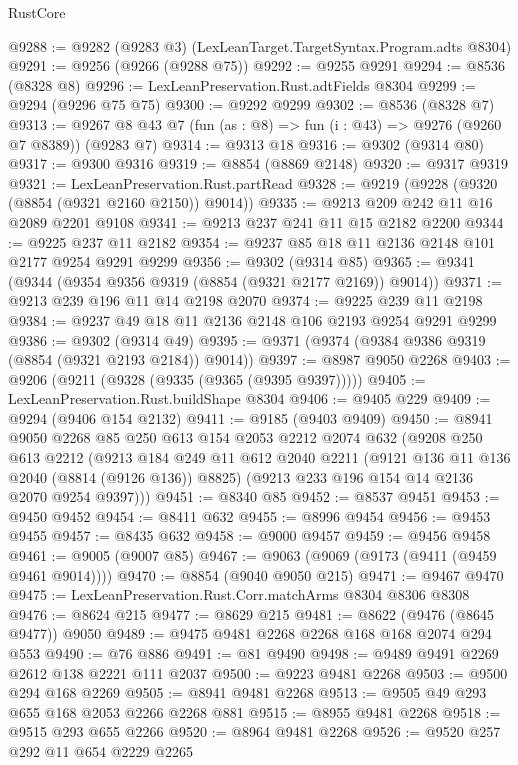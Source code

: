 \begin{lexlean}{RustCore}
\begin{coremodule}
@9288 := @9282 (@9283 @3) (LexLeanTarget.TargetSyntax.Program.adts @8304)
@9291 := @9256 (@9266 (@9288 @75))
@9292 := @9255 @9291
@9294 := @8536 (@8328 @8)
@9296 := LexLeanPreservation.Rust.adtFields @8304
@9299 := @9294 (@9296 @75 @75)
@9300 := @9292 @9299
@9302 := @8536 (@8328 @7)
@9313 := @9267 @8 @43 @7 (fun (as : @8) => fun (i : @43) => @9276 (@9260 @7 @8389)) (@9283 @7)
@9314 := @9313 @18
@9316 := @9302 (@9314 @80)
@9317 := @9300 @9316
@9319 := @8854 (@8869 @2148)
@9320 := @9317 @9319
@9321 := LexLeanPreservation.Rust.partRead
@9328 := @9219 (@9228 (@9320 (@8854 (@9321 @2160 @2150)) @9014))
@9335 := @9213 @209 @242 @11 @16 @2089 @2201 @9108
@9341 := @9213 @237 @241 @11 @15 @2182 @2200
@9344 := @9225 @237 @11 @2182
@9354 := @9237 @85 @18 @11 @2136 @2148 @101 @2177 @9254 @9291 @9299
@9356 := @9302 (@9314 @85)
@9365 := @9341 (@9344 (@9354 @9356 @9319 (@8854 (@9321 @2177 @2169)) @9014))
@9371 := @9213 @239 @196 @11 @14 @2198 @2070
@9374 := @9225 @239 @11 @2198
@9384 := @9237 @49 @18 @11 @2136 @2148 @106 @2193 @9254 @9291 @9299
@9386 := @9302 (@9314 @49)
@9395 := @9371 (@9374 (@9384 @9386 @9319 (@8854 (@9321 @2193 @2184)) @9014))
@9397 := @8987 @9050 @2268
@9403 := @9206 (@9211 (@9328 (@9335 (@9365 (@9395 @9397)))))
@9405 := LexLeanPreservation.Rust.buildShape @8304
@9406 := @9405 @229
@9409 := @9294 (@9406 @154 @2132)
@9411 := @9185 (@9403 @9409)
@9450 := @8941
    @9050
    @2268
    @85
    @250
    @613
    @154
    @2053
    @2212
    @2074
    @632
    (@9208
      @250
      @613
      @2212
      (@9213
        @184
        @249
        @11
        @612
        @2040
        @2211
        (@9121 @136 @11 @136 @2040 (@8814 (@9126 @136)) @8825)
        (@9213 @233 @196 @154 @14 @2136 @2070 @9254 @9397)))
@9451 := @8340 @85
@9452 := @8537 @9451
@9453 := @9450 @9452
@9454 := @8411 @632
@9455 := @8996 @9454
@9456 := @9453 @9455
@9457 := @8435 @632
@9458 := @9000 @9457
@9459 := @9456 @9458
@9461 := @9005 (@9007 @85)
@9467 := @9063 (@9069 (@9173 (@9411 (@9459 @9461 @9014))))
@9470 := @8854 (@9040 @9050 @215)
@9471 := @9467 @9470
@9475 := LexLeanPreservation.Rust.Corr.matchArms @8304 @8306 @8308
@9476 := @8624 @215
@9477 := @8629 @215
@9481 := @8622 (@9476 (@8645 @9477)) @9050
@9489 := @9475 @9481 @2268 @2268 @168 @168 @2074 @294 @553
@9490 := @76 @886
@9491 := @81 @9490
@9498 := @9489 @9491 @2269 @2612 @138 @2221 @111 @2037
@9500 := @9223 @9481 @2268
@9503 := @9500 @294 @168 @2269
@9505 := @8941 @9481 @2268
@9513 := @9505 @49 @293 @655 @168 @2053 @2266 @2268 @881
@9515 := @8955 @9481 @2268
@9518 := @9515 @293 @655 @2266
@9520 := @8964 @9481 @2268
@9526 := @9520 @257 @292 @11 @654 @2229 @2265

\end{coremodule}
\end{lexlean}
